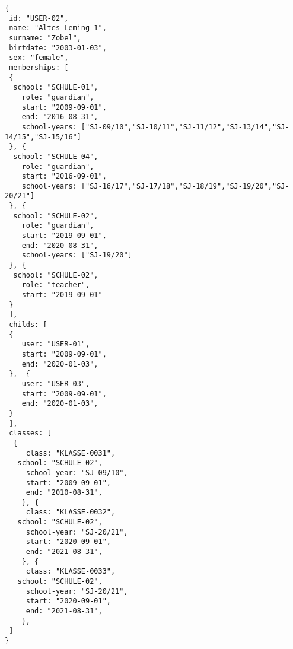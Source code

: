 
\begin{lstlisting}[caption={Beispiel für Benutzer mit Rollen 'teachers' und 'guardians'},frame=tlrb]
{
 id: "USER-02",
 name: "Altes Leming 1",
 surname: "Zobel",
 birtdate: "2003-01-03",
 sex: "female",
 memberships: [
 {
  school: "SCHULE-01",
	role: "guardian",
	start: "2009-09-01",
	end: "2016-08-31",
	school-years: ["SJ-09/10","SJ-10/11","SJ-11/12","SJ-13/14","SJ-14/15","SJ-15/16"]
 }, {
  school: "SCHULE-04",
	role: "guardian",
	start: "2016-09-01",
	school-years: ["SJ-16/17","SJ-17/18","SJ-18/19","SJ-19/20","SJ-20/21"]
 }, {
  school: "SCHULE-02",
	role: "guardian",
	start: "2019-09-01",
	end: "2020-08-31",
	school-years: ["SJ-19/20"]
 }, {
  school: "SCHULE-02",
	role: "teacher",
	start: "2019-09-01"
 }
 ],
 childs: [
 {
	user: "USER-01",
	start: "2009-09-01",
	end: "2020-01-03",
 },  {
	user: "USER-03",
	start: "2009-09-01",
	end: "2020-01-03",
 }
 ],
 classes: [
  {
	 class: "KLASSE-0031",
   school: "SCHULE-02",
	 school-year: "SJ-09/10",
	 start: "2009-09-01",
	 end: "2010-08-31",
	}, {
	 class: "KLASSE-0032",
   school: "SCHULE-02",
	 school-year: "SJ-20/21",
	 start: "2020-09-01",
	 end: "2021-08-31",
	}, {
	 class: "KLASSE-0033",
   school: "SCHULE-02",
	 school-year: "SJ-20/21",
	 start: "2020-09-01",
	 end: "2021-08-31",
	}, 
 ]
}
\end{lstlisting}
